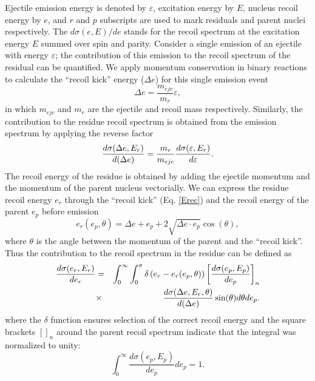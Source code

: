 Ejectile emission energy is denoted by $\varepsilon$, excitation energy by $%
E $, nucleus recoil energy by $e$, and $r$ and $p$ subscripts are used to
mark residuals and parent nuclei respectively. The $d\sigma(e,E)/de$ stands
for the recoil spectrum at the excitation energy $E$ summed over spin and
parity. Consider a single emission of an ejectile with energy $\varepsilon$;
the contribution of this emission to the recoil spectrum of the residual can
be quantified. We apply momentum conservation in binary reactions to
calculate the {}``recoil kick'' energy ($\Delta e$) for this single emission
event
\begin{equation}
\Delta e=\frac{m_{ejc}}{m_{r}}\varepsilon,  \label{Erec}
\end{equation}
in which $m_{ejc}$ and $m_{r}$ are the ejectile and recoil mass
respectively. Similarly, the contribution to the residue recoil spectrum is
obtained from the emission spectrum by applying the reverse factor
\begin{equation}
\frac{d\sigma(\Delta e,E_{r})}{d(\Delta e)}=\frac{m_{r}}{m_{ejc}}\frac{%
d\sigma(\varepsilon,E_{r})}{d\varepsilon}.  \label{CSkick}
\end{equation}
The recoil energy of the residue is obtained by adding the ejectile momentum
and the momentum of the parent nucleus vectorially. We can express the
residue recoil energy $e_{r}$ through the {}``recoil kick'' (Eq. \ref{Erec})
and the recoil energy of the parent $e_{p}$ before emission
\begin{equation}
e_{r}(e_{p},\theta)=\Delta e+e_{p}+2\sqrt{\Delta e\cdot e_{p}}\cos(\theta),
\label{Eresrec}
\end{equation}
\noindent where $\theta$ is the angle between the momentum of the parent and
the {}``recoil kick''. Thus the contribution to the recoil spectrum in the
residue can be defined as
\begin{eqnarray}
\frac{d\sigma(e_{r},E_{r})}{de_{r}}&=&\int_{0}^{\infty}\int_{0}^{\pi}\delta%
\left(e_{r}-e_{r}(e_{p},\theta)\right)\left[\frac{d\sigma(e_{p},E_{p})}{%
de_{p}}\right]_{n}  \notag \\
&\times&\frac{d\sigma(\Delta e,E_{r},\theta)}{d(\Delta e)}%
\sin(\theta)d\theta de_{p}.  \label{CSrec}
\end{eqnarray}
\noindent where the $\delta$ function ensures selection of the correct
recoil energy and the square brackets $\left[\right]_{n}$ around the parent
recoil spectrum indicate that the integral was normalized to unity:
\begin{equation}
\int_{0}^{\infty}\frac{d\sigma(e_{p},E_{p})}{de_{p}}de_{p}=1.
\end{equation}
